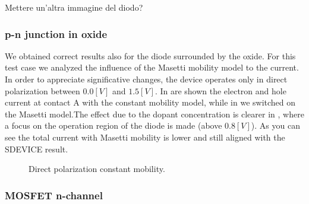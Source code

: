 \vspace{2cm}
Mettere un'altra immagine del diodo?



\clearpage



\subsubsection{p-n junction in oxide}

We obtained correct results also for the diode surrounded by the oxide. For this test case we analyzed the influence of the Masetti mobility model to the current. In order to appreciate significative changes, the device operates only in direct polarization between $0.0[V]$ and $1.5[V]$.
In  are shown the electron and hole current at contact A with the constant mobility model, while in  we switched on the Masetti model.The effect due to the dopant concentration is clearer in , where a focus on the  operation region of the diode is made (above $0.8[V]$). As you can see the total current with Masetti mobility is lower and still aligned with the SDEVICE result.


\begin{figure}[!h]
\centering
{}


\caption{Direct polarization constant mobility.}
\end{figure}



%
%



\clearpage

\subsubsection{MOSFET n-channel}

